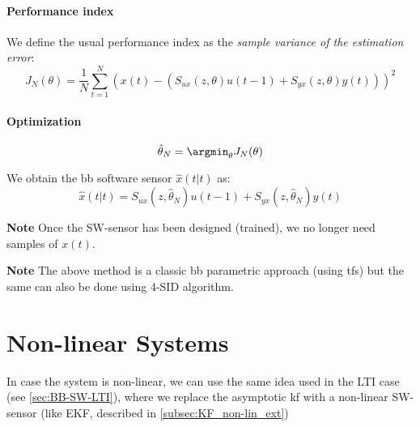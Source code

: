 \paragraph{Performance index}
We define the usual performance index as the \emph{sample variance of the estimation error}: 
\[
    J_N(\theta) = \frac{1}{N}\sum_{t=1}^N \left( x(t) - (S_{ux}(z, \theta) u(t-1) + S_{yx}(z,\theta)y(t)) \right)^2
\]

\paragraph{Optimization}
\[
    \hat{\theta}_N = \argmin_\theta J_N(\theta)
\]

We obtain the \acrlong{bb} software sensor $\hat{x}(t|t)$ as: 
\[
	\hat{x}(t|t) = S_{ux}(z, \hat{\theta}_N) u(t-1) + S_{yx}(z,\hat{\theta}_N)y(t)
\]


\textbf{Note} Once the SW-sensor has been designed (trained), we no longer need samples of $x(t)$.

\textbf{Note} The above method is a classic \gls{bb} parametric approach (using \gls{tf}s) but the same can also be done using 4-SID algorithm.


\section{Non-linear Systems}

In case the system is non-linear, we can use the same idea used in the LTI case (see \ref{sec:BB-SW-LTI}), where we replace the asymptotic \gls{kf} with a non-linear SW-sensor (like EKF, described in \ref{subsec:KF_non-lin_ext})

\begin{figure}[H]
    \centering
\end{figure}

